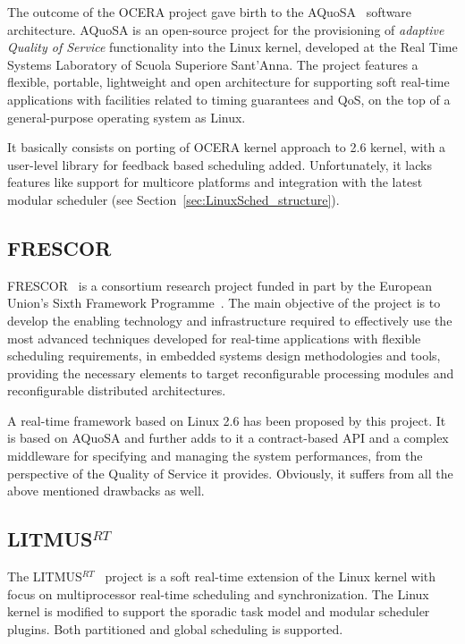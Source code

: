 The outcome of the OCERA project gave birth to the
AQuoSA~\cite{AQuoSA} software architecture. AQuoSA is an open-source
project for the provisioning of \emph{ adaptive Quality of Service}
functionality into the Linux kernel, developed at the Real Time
Systems Laboratory of Scuola Superiore Sant'Anna. The project features
a flexible, portable, lightweight and open architecture for supporting
soft real-time applications with facilities related to timing
guarantees and QoS, on the top of a general-purpose operating system
as Linux.

It basically consists on porting of OCERA kernel approach to 2.6
kernel, with a user-level library for feedback based scheduling added.
Unfortunately, it lacks features like support for multicore platforms
and integration with the latest modular scheduler (see
Section~\ref{sec:LinuxSched_structure}).

\subsection{FRESCOR\label{sec:StateArt_Frescor}}

FRESCOR~\cite{FRESCOR} is a consortium research project funded in part
by the European Union's Sixth Framework Programme~\cite{FP6}.  The
main objective of the project is to develop the enabling technology
and infrastructure required to effectively use the most advanced
techniques developed for real-time applications with flexible
scheduling requirements, in embedded systems design methodologies and
tools, providing the necessary elements to target reconfigurable
processing modules and reconfigurable distributed architectures.

A real-time framework based on Linux 2.6 has been proposed by this
project. It is based on AQuoSA and further adds to it a contract-based
API and a complex middleware for specifying and managing the system
performances, from the perspective of the Quality of Service it
provides. Obviously, it suffers from all the above mentioned drawbacks
as well.

\subsection{LITMUS$^{RT}$\label{sec:StateArt_LITMUS}}

The LITMUS$^{RT}$~\cite{LITMUS} project is a soft real-time extension
of the Linux kernel with focus on multiprocessor real-time scheduling
and synchronization. The Linux kernel is modified to support the
sporadic task model and modular scheduler plugins. Both partitioned
and global scheduling is supported.

